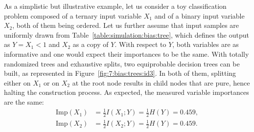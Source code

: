 As a simplistic but illustrative example, let us consider a toy classification
problem composed of a ternary input variable $X_1$ and of a binary input
variable $X_2$, both of them being ordered. Let us further assume that input samples are uniformly drawn
from Table~\ref{table:simulation:bias:tree}, which defines the output as $Y =
X_1 < 1$ and $X_2$ as a copy of $Y$. With respect to $Y$, both variables are as
informative and one would expect their importances to be the same.  With
totally randomized trees and exhaustive splits, two equiprobable decision trees
can be built, as represented in Figure~\ref{fig:7:bias:trees:id3}. In both of
them, splitting either on $X_1$ or on $X_2$ at the root node results in child
nodes that are pure, hence halting the construction process. As expected, the measured
variable importances are the same:
\begin{align*}
\text{Imp}(X_1) &= \frac{1}{2} I(X_1;Y) = \frac{1}{2} H(Y) = 0.459, \\
\text{Imp}(X_2) &= \frac{1}{2} I(X_2;Y) = \frac{1}{2} H(Y) = 0.459.
\end{align*}

